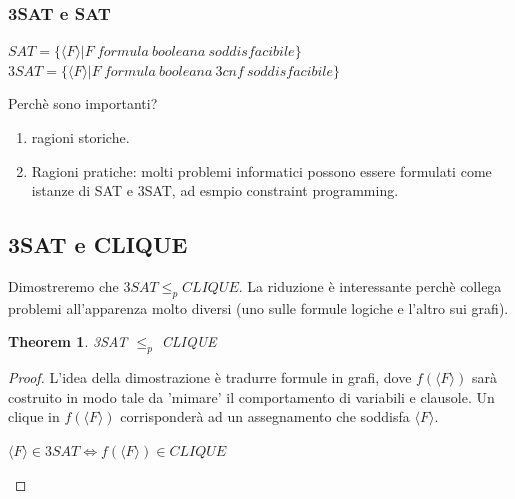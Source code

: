 \documentclass[a4paper, 12pt]{article}
\newtheorem{theorem}{Theorem}[section]
\begin{document}
\subsubsection{3SAT e SAT}
\begin{center}
$SAT = \{\langle F \rangle | F\ formula\ booleana\ soddisfacibile\}$\\
$3SAT = \{\langle F \rangle | F\ formula\ booleana\ 3cnf\ soddisfacibile\}$
\end{center}
Perch\`e sono importanti?\\
\begin{enumerate}
\item ragioni storiche.
\item Ragioni pratiche: molti problemi informatici possono essere formulati come istanze di SAT e 3SAT, ad esmpio constraint programming.
\end{enumerate}
\subsection{3SAT e CLIQUE}
Dimostreremo che $3SAT \leq_p CLIQUE$. La riduzione \`e interessante perch\`e collega problemi all'apparenza molto diversi (uno sulle formule logiche e l'altro sui grafi).
\begin{theorem}
\label{th:10}
3SAT $\leq_p$ CLIQUE
\end{theorem}
\begin{proof}
L'idea della dimostrazione \`e tradurre formule in grafi, dove $f(\langle F \rangle)$ sar\`a costruito in modo tale da 'mimare' il comportamento di variabili e clausole. Un clique in $f(\langle F \rangle)$ corrisponder\`a ad un assegnamento che soddisfa $\langle F \rangle$.
\begin{center}
$\langle F \rangle \in 3SAT \iff f(\langle F \rangle) \in CLIQUE$
\end{center}
\end{proof}
\end{document}
